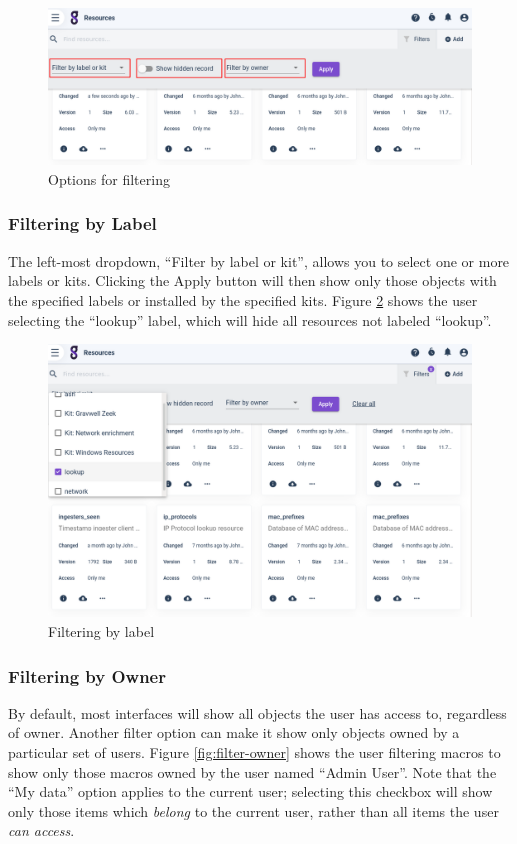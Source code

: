 \begin{figure}
	\includegraphics[width=0.7\linewidth]{images/filters-options.png}
	\caption{Options for filtering}
	\label{fig:filters-options}
\end{figure}

\subsubsection{Filtering by Label}

The left-most dropdown, ``Filter by label or kit'', allows you to select one or more labels or kits. Clicking the Apply button will then show only those objects with the specified labels or installed by the specified kits. Figure \ref{fig:filter-labels} shows the user selecting the ``lookup'' label, which will hide all resources not labeled ``lookup''.

\begin{figure}
	\includegraphics[width=0.8\linewidth]{images/filter-labels.png}
	\caption{Filtering by label}
	\label{fig:filter-labels}
\end{figure}

\subsubsection{Filtering by Owner}

By default, most interfaces will show all objects the user has access to, regardless of owner. Another filter option can make it show only objects owned by a particular set of users. Figure \ref{fig:filter-owner} shows the user filtering macros to show only those macros owned by the user named ``Admin User''. Note that the ``My data'' option applies to the current user; selecting this checkbox will show only those items which \emph{belong} to the current user, rather than all items the user \emph{can access}.

